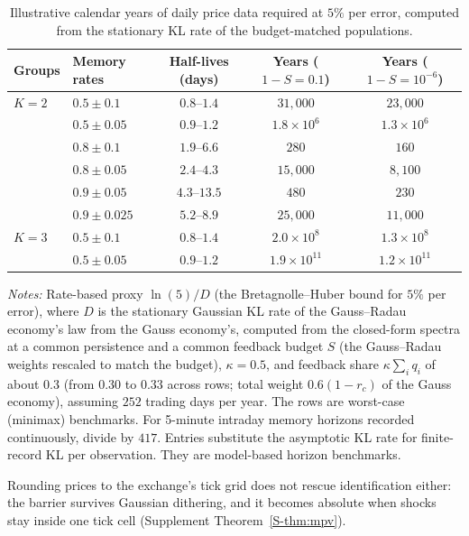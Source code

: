 \documentclass[11pt,letterpaper]{article}
\theoremstyle{definition}
\begin{document}
\begin{table}[!htbp]
\centering
\caption{Illustrative calendar years of daily price data required at $5\%$ per error, computed from the stationary KL rate of the budget-matched populations.}
\label{tab:years}
\small
\begin{tabular}{@{}llccc@{}}
\toprule
Groups & Memory rates & Half-lives (days) & Years ($1 - S = 0.1$) & Years ($1 - S = 10^{-6}$) \\
\midrule
$K = 2$ & $0.5 \pm 0.1$   & $0.8\text{--}1.4$  & $31{,}000$        & $23{,}000$ \\
        & $0.5 \pm 0.05$  & $0.9\text{--}1.2$  & $1.8 \times 10^6$ & $1.3 \times 10^6$ \\
        & $0.8 \pm 0.1$   & $1.9\text{--}6.6$  & $280$             & $160$ \\
        & $0.8 \pm 0.05$  & $2.4\text{--}4.3$  & $15{,}000$        & $8{,}100$ \\
        & $0.9 \pm 0.05$  & $4.3\text{--}13.5$ & $480$             & $230$ \\
        & $0.9 \pm 0.025$ & $5.2\text{--}8.9$  & $25{,}000$        & $11{,}000$ \\
\midrule
$K = 3$ & $0.5 \pm 0.1$   & $0.8\text{--}1.4$  & $2.0 \times 10^8$ & $1.3 \times 10^8$ \\
        & $0.5 \pm 0.05$  & $0.9\text{--}1.2$  & $1.9 \times 10^{11}$ & $1.2 \times 10^{11}$ \\
\bottomrule
\end{tabular}
\vspace{4pt}
\parbox{\linewidth}{\footnotesize\emph{Notes:} Rate-based proxy $\ln(5)/D$ (the Bretagnolle--Huber bound for $5\%$ per error), where $D$ is the stationary Gaussian KL rate of the Gauss--Radau economy's law from the Gauss economy's, computed from the closed-form spectra at a common persistence and a common feedback budget $S$ (the Gauss--Radau weights rescaled to match the budget), $\kappa = 0.5$, and feedback share $\kappa \sum_i q_i$ of about $0.3$ (from $0.30$ to $0.33$ across rows; total weight $0.6(1 - r_c)$ of the Gauss economy), assuming $252$ trading days per year. The rows are worst-case (minimax) benchmarks. For 5-minute intraday memory horizons recorded continuously, divide by $417$. Entries substitute the asymptotic KL rate for finite-record KL per observation. They are model-based horizon benchmarks.}
\end{table}


Rounding prices to the exchange's tick grid does not rescue identification either: the barrier survives Gaussian dithering, and it becomes absolute when shocks stay inside one tick cell (Supplement Theorem~\ref{S-thm:mpv}).
\end{document}
